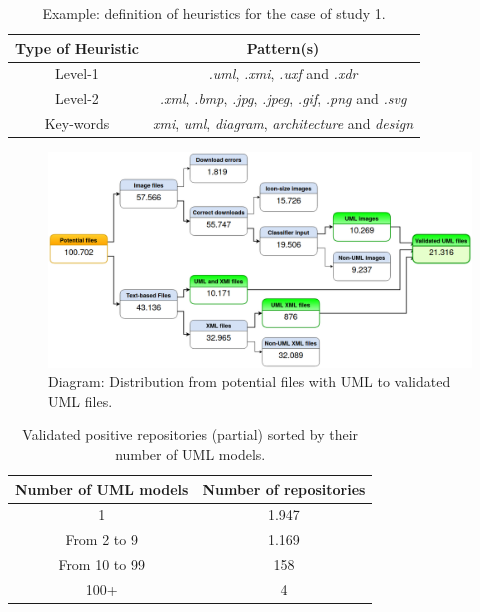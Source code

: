 \documentclass[a4paper, 12pt]{book}
\begin{document}
 \begin{table}[]
 \centering
 \caption{Example: definition of heuristics for the case of study 1.}
 \label{table:heuristics-cs1-example}
 \begin{tabular}{|c|c|}
 \hline
 \textbf{Type of Heuristic} & \textbf{Pattern(s)}                                                                                           \\ \hline
 Level-1                    & \textit{.uml}, \textit{.xmi}, \textit{.uxf} and \textit{.xdr}                                                 \\ \hline
 Level-2                    & \textit{.xml}, \textit{.bmp}, \textit{.jpg}, \textit{.jpeg}, \textit{.gif}, \textit{.png} and \textit{.svg}   \\ \hline
 Key-words                  & \textit{xmi}, \textit{uml}, \textit{diagram}, \textit{architecture} and \textit{design}                       \\ \hline
 \end{tabular}
 \end{table}
 \begin{figure}
   \centering
   \includegraphics[width=16cm, keepaspectratio]{img/file-results-models-diagram}
   \caption{Diagram: Distribution from potential files with UML to validated UML files.}
   \label{fig:validated-files-distribution}
 \end{figure}
 \begin{table}[]
   \centering
   \caption{Validated positive repositories (partial) sorted by their number of UML models.}
   \label{table:validated-repos-table}
   \begin{tabular}{|c|c|}
   \hline
   \textbf{Number of UML models} & \textbf{Number of repositories}     \\ \hline
   1                             & 1.947                               \\
   From 2 to 9                   & 1.169                               \\
   From 10 to 99                 & 158                                 \\
   100+                          & 4                                   \\ \hline
   \end{tabular}
 \end{table}
\end{document}
